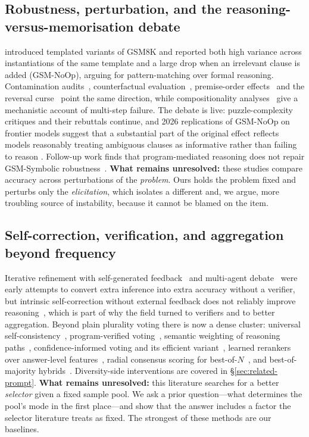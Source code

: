 \subsection{Robustness, perturbation, and the reasoning-versus-memorisation debate}

\citet{mirzadeh2025gsmsymbolic} introduced templated variants of GSM8K and
reported both high variance across instantiations of the same template and a
large drop when an irrelevant clause is added (GSM-NoOp), arguing for
pattern-matching over formal reasoning. Contamination
audits~\citep{zhang2024gsm1k}, counterfactual
evaluation~\citep{wu2024reciting}, premise-order
effects~\citep{chen2024premise} and the reversal
curse~\citep{berglund2024reversal} point the same direction, while
compositionality analyses~\citep{dziri2023faithfate} give a mechanistic account
of multi-step failure. The debate is live: puzzle-complexity critiques and
their rebuttals continue, and 2026 replications of GSM-NoOp on frontier models
suggest that a substantial part of the original effect reflects models
reasonably treating ambiguous clauses as informative rather than failing to
reason . Follow-up
work finds that program-mediated reasoning does not repair GSM-Symbolic
robustness~\citep{reasoningcodeboth2026}. \textbf{What remains unresolved:}
these studies compare accuracy across perturbations of the \emph{problem}. Ours
holds the problem fixed and perturbs only the \emph{elicitation}, which
isolates a different and, we argue, more troubling source of instability,
because it cannot be blamed on the item.

\subsection{Self-correction, verification, and aggregation beyond frequency}

Iterative refinement with self-generated feedback~\citep{madaan2023selfrefine}
and multi-agent debate~\citep{du2024debate} were early attempts to convert extra
inference into extra accuracy without a verifier, but intrinsic self-correction
without external feedback does not reliably improve
reasoning~\citep{huang2024cannotselfcorrect,kamoi2024whencan}, which is part of
why the field turned to verifiers and to better aggregation. Beyond plain
plurality voting there is now a dense cluster: universal
self-consistency~\citep{chen2023universal}, program-verified
voting~\citep{prove2024}, semantic weighting of reasoning
paths~\citep{weightedreasoning2024}, confidence-informed voting and its
efficient variant~\citep{veccisc2026}, learned rerankers over answer-level
features~\citep{risc2026}, radial consensus scoring for
best-of-$N$~\citep{rcs2026}, and best-of-majority
hybrids~\citep{bestofmajority2025}.
Diversity-side interventions are covered in
\S\ref{sec:related-prompt}. \textbf{What remains unresolved:}
this literature searches for a better \emph{selector} given a fixed sample
pool. We ask a prior question---what determines the pool's mode in the first
place---and show that the answer includes a factor the selector literature
treats as fixed. The strongest of these methods are our baselines.

